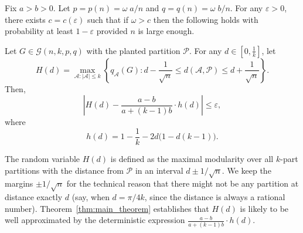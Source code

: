 \documentclass[a4paper,UKenglish,cleveref, autoref, thm-restate,numberwithinsect]{lipics-v2021}
\newcommand{\cA}{\mathcal{A}}
\newcommand{\cP}{\mathcal{P}}
\newcommand{\eps}{\varepsilon}
\begin{document}
\begin{theorem}\label{thm:main_theorem} 
Fix $a>b>0$. Let $p=p(n)=\omega\; a / n$ and $q=q(n)=\omega \; b/n$. For any $\eps>0$, there exists $c=c(\eps)$ such that if $\omega>c$ then the following holds with probability at least $1-\eps$ provided $n$ is large enough. 



Let $G \in \mathcal{G}(n,k,p,q)$ with the planted partition $\cP$. 
For any $d \in \left[0,\frac{1}{k}\right]$, 
let 
$$H(d) = \max_{\cA: |\cA|\le k} \left\{ q_\cA(G) : d - \frac{1}{\sqrt{n}} \le d(\cA, \cP) \le d + \frac{1}{\sqrt{n}} \right\}.
$$
Then,
\begin{equation*}
\left| H(d)  - \frac {a-b}{a+(k-1)b}\cdot h(d) \right| \le \eps,
\end{equation*}
where 
\[h(d)= 1 - \frac {1}{k} - 2d\big (1-d(k-1)\big). \]
\end{theorem}
The random variable $H(d)$ is defined as the maximal modularity over all $k$-part partitions with the distance from $\cP$ in an interval $d\pm 1/\sqrt{n}$. We keep the margins $\pm 1/\sqrt{n}$ for the technical reason that there might not be any partition at distance exactly $d$ (say, when $d = \pi / 4k$, since the distance is always a rational number). Theorem~\ref{thm:main_theorem} establishes that $H(d)$ is likely to be well approximated by the deterministic expression $\frac{a-b}{a+(k-1)b}\cdot h(d)$.
\end{document}
